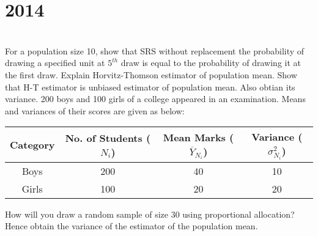 \section*{2014}
\vspace{-.5cm}
\hrulefill \smallskip\\
 For a population size 10, show that SRS without replacement the probability of drawing a specified unit at $5^{th}$ draw is equal to the probability of drawing it at the first draw.
\myline
{} Explain Horvitz-Thomson estimator of population mean. Show that H-T estimator is unbiased estimator of population mean. Also obtian its variance.
\myline
{} 200 boys and 100 girls of a college appeared in an examination. Means and variances of their scores are given as below:
\begin{center}
 \begin{tabular}{|*{4}{c|}} \hline
    \textbf{Category} & No. of Students ($N_i$) & Mean Marks ($\overline{Y}_{N_i}$) & Variance ($\sigma_{N_i}^2$)  \\ \hline
    Boys & 200 & 40 & 10 \\ \hline
    Girls & 100 & 20 & 20 \\\hline
\end{tabular}   
\end{center} How will you draw a random sample of size 30 using proportional allocation? Hence obtain the variance of the estimator of the population mean.
